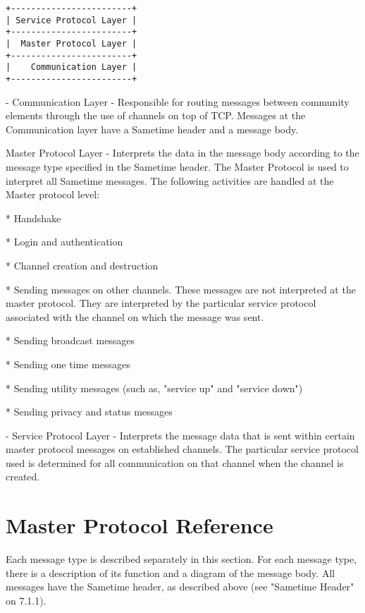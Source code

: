 \documentclass[titlepage,oneside]{book}
\begin{document}
\begin{verbatim}
+------------------------+
| Service Protocol Layer |
+------------------------+
|  Master Protocol Layer |
+------------------------+
|    Communication Layer |
+------------------------+
\end{verbatim}

\par{} - Communication Layer - Responsible for routing messages between
community elements through the use of channels on top of TCP. Messages
at the Communication layer have a Sametime header and a message body.

\par{} Master Protocol Layer - Interprets the data in the message body
according to the message type specified in the Sametime header. The
Master Protocol is used to interpret all Sametime messages. The
following   activities are handled at the Master protocol level:

\subpar{}     * Handshake

\subpar{}     * Login and authentication

\subpar{}     * Channel creation and destruction

\subpar{}     * Sending messages on other channels. These messages are not
      interpreted at the master protocol. They are interpreted by
      the particular service protocol associated with the channel
      on which the message was sent.

\subpar{}     * Sending broadcast messages

\subpar{}     * Sending one time messages

\subpar{}     * Sending utility messages (such as, "service up" and "service
      down")

\subpar{}     * Sending privacy and status messages

\par{} - Service Protocol Layer - Interprets the message data that is sent
within certain master protocol messages on established channels. The
particular service protocol used is determined for all communication on
that channel when the channel is created.

\chapter{Master Protocol Reference}

\par{} Each message type is described separately in this section. For
each message type, there is a description of its function and a
diagram of the message body. All messages have the Sametime header, as
described above (see "Sametime Header" on 7.1.1).
\end{document}
